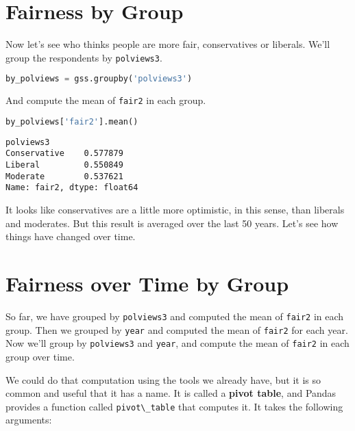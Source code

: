 \section{Fairness by Group}\label{fairness-by-group}

Now let's see who thinks people are more fair, conservatives or
liberals. We'll group the respondents by
\passthrough{\lstinline!polviews3!}.

\begin{lstlisting}[language=Python,style=source]
by_polviews = gss.groupby('polviews3')
\end{lstlisting}

And compute the mean of \passthrough{\lstinline!fair2!} in each group.

\begin{lstlisting}[language=Python,style=source]
by_polviews['fair2'].mean()
\end{lstlisting}

\begin{lstlisting}[style=output]
polviews3
Conservative    0.577879
Liberal         0.550849
Moderate        0.537621
Name: fair2, dtype: float64
\end{lstlisting}

It looks like conservatives are a little more optimistic, in this sense,
than liberals and moderates. But this result is averaged over the last
50 years. Let's see how things have changed over time.

\section{Fairness over Time by Group}\label{fairness-over-time-by-group}

So far, we have grouped by \passthrough{\lstinline!polviews3!} and
computed the mean of \passthrough{\lstinline!fair2!} in each group. Then
we grouped by \passthrough{\lstinline!year!} and computed the mean of
\passthrough{\lstinline!fair2!} for each year. Now we'll group by
\passthrough{\lstinline!polviews3!} and \passthrough{\lstinline!year!},
and compute the mean of \passthrough{\lstinline!fair2!} in each group
over time.

We could do that computation using the tools we already have, but it is
so common and useful that it has a name. It is called a \textbf{pivot
table}, and Pandas provides a function called
\passthrough{\lstinline!pivot\_table!} that computes it. It takes the
following arguments:

